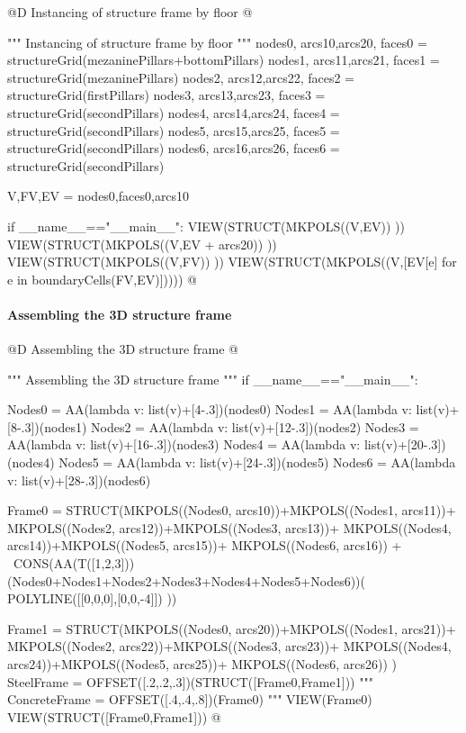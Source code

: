 \documentclass[11pt,oneside]{article}    %
\begin{document}
@D Instancing of structure frame by floor 
@{""" Instancing of structure frame by floor """
nodes0, arcs10,arcs20, faces0 = structureGrid(mezaninePillars+bottomPillars)
nodes1, arcs11,arcs21, faces1 = structureGrid(mezaninePillars)
nodes2, arcs12,arcs22, faces2 = structureGrid(firstPillars)
nodes3, arcs13,arcs23, faces3 = structureGrid(secondPillars)
nodes4, arcs14,arcs24, faces4 = structureGrid(secondPillars)
nodes5, arcs15,arcs25, faces5 = structureGrid(secondPillars)
nodes6, arcs16,arcs26, faces6 = structureGrid(secondPillars)

V,FV,EV = nodes0,faces0,arcs10

if __name__=="__main__":
    VIEW(STRUCT(MKPOLS((V,EV)) ))
    VIEW(STRUCT(MKPOLS((V,EV + arcs20)) ))
    VIEW(STRUCT(MKPOLS((V,FV)) ))
    VIEW(STRUCT(MKPOLS((V,[EV[e] for e in boundaryCells(FV,EV)]))))
@}


\paragraph{Assembling the 3D structure frame}
@D Assembling the 3D structure frame 
@{""" Assembling the 3D structure frame """
if __name__=="__main__":

    Nodes0 = AA(lambda v: list(v)+[4-.3])(nodes0)
    Nodes1 = AA(lambda v: list(v)+[8-.3])(nodes1)
    Nodes2 = AA(lambda v: list(v)+[12-.3])(nodes2)
    Nodes3 = AA(lambda v: list(v)+[16-.3])(nodes3)
    Nodes4 = AA(lambda v: list(v)+[20-.3])(nodes4)
    Nodes5 = AA(lambda v: list(v)+[24-.3])(nodes5)
    Nodes6 = AA(lambda v: list(v)+[28-.3])(nodes6)
    
    Frame0 = STRUCT(MKPOLS((Nodes0, arcs10))+MKPOLS((Nodes1, arcs11))+
        MKPOLS((Nodes2, arcs12))+MKPOLS((Nodes3, arcs13))+
        MKPOLS((Nodes4, arcs14))+MKPOLS((Nodes5, arcs15))+
        MKPOLS((Nodes6, arcs16)) + \
        CONS(AA(T([1,2,3]))(Nodes0+Nodes1+Nodes2+Nodes3+Nodes4+Nodes5+Nodes6))(
        POLYLINE([[0,0,0],[0,0,-4]])  ))
    
    Frame1 = STRUCT(MKPOLS((Nodes0, arcs20))+MKPOLS((Nodes1, arcs21))+
        MKPOLS((Nodes2, arcs22))+MKPOLS((Nodes3, arcs23))+
        MKPOLS((Nodes4, arcs24))+MKPOLS((Nodes5, arcs25))+
        MKPOLS((Nodes6, arcs26)) )
    SteelFrame = OFFSET([.2,.2,.3])(STRUCT([Frame0,Frame1]))
    """
    ConcreteFrame = OFFSET([.4,.4,.8])(Frame0)
    """
    VIEW(Frame0)
    VIEW(STRUCT([Frame0,Frame1]))
@}
\end{document}
